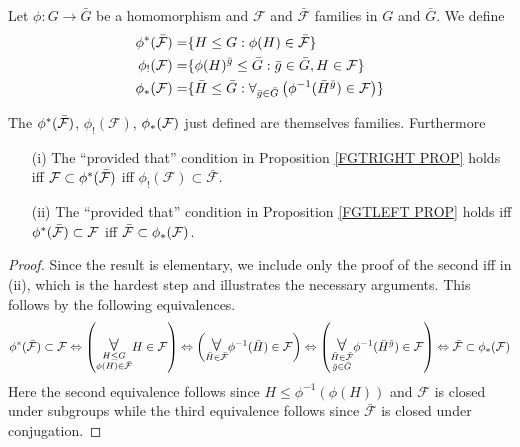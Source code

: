 \documentclass[a4paper,10pt]{article}%
\begin{document}
\begin{definition}
	Let $\phi \colon G \to \bar{G}$ be a homomorphism and $\mathcal{F}$ and $\bar{\mathcal{F}}$ families in $G$
	and $\bar{G}$. We define
\begin{align}\label{PHISTARDEF EQ}
	\phi^{\**}(\bar{\mathcal{F}})
		=&
	\{H \leq G : \phi(H) \in \bar{\mathcal{F}}\}
\\
	\phi_!(\mathcal{F})
		=&
	\{\phi(H)^{\bar{g}}\leq \bar{G} : \bar{g} \in \bar{G}, H \in \mathcal{F}\}
\\ \label{PHISTARDEF3 EQ}
	\phi_{\**}(\mathcal{F})
		=&
	\{\bar{H} \leq \bar{G} : 
	\forall_{\bar{g} \in \bar{G}} 
	\left(
	\phi^{-1}(\bar{H}^{\bar{g}}) \in \mathcal{F}
	\right)\}
\end{align}
\end{definition}

\begin{lemma}\label{REWORFAM LEM}
The $\phi^{\**}(\bar{\mathcal{F}})$, $\phi_{!}(\mathcal{F})$, $\phi_{\**}(\mathcal{F})$ just defined are 
themselves families. Furthermore
\begin{itemize}
\item[(i)] The ``provided that'' condition in Proposition \ref{FGTRIGHT PROP} holds iff 
$\mathcal{F} \subset \phi^{\**} (\bar{\mathcal{F}})$
iff
$\phi_{!}(\mathcal{F}) \subset \bar{\mathcal{F}}$.
\item [(ii)]
The ``provided that'' condition in Proposition \ref{FGTLEFT PROP} holds iff 
$\phi^{\**} (\bar{\mathcal{F}}) \subset \mathcal{F}$
iff
$\bar{\mathcal{F}} \subset \phi_{\**}(\mathcal{F})$.
\end{itemize}
\end{lemma}


\begin{proof}
	Since the result is elementary, we include only the proof of the second iff in (ii), which is the hardest step and illustrates the necessary arguments. This follows by the following equivalences.
\[
	\phi^{\**} (\bar{\mathcal{F}}) \subset \mathcal{F}
\Leftrightarrow
	\left( \underset{ \substack{H \leq G \\ \phi(H) \in \bar{\mathcal{F}} }}{\mathlarger{\mathlarger{\forall}}} 
	H \in \mathcal{F} \right)
\Leftrightarrow
	\left( \underset{\bar{H} \in \bar{\mathcal{F}}}{\mathlarger{\mathlarger{\forall}}}
	\phi^{-1}(\bar{H}) \in \mathcal{F}
	\right)
\Leftrightarrow
	\left( \underset{ \substack{\bar{H} \in \bar{\mathcal{F}}\\\bar{g} \in \bar{G}}}{\mathlarger{\mathlarger{\forall}}}
	\phi^{-1}(\bar{H}^{\bar{g}}) \in \mathcal{F}
	\right)
\Leftrightarrow
        \bar{\mathcal F} \subset \phi_{\**}(\mathcal F)
\]
Here the second equivalence follows since 
$H \leq \phi^{-1}(\phi(H))$ and $\mathcal{F}$ is closed under subgroups while the third equivalence follows since 
$\bar{\mathcal{F}}$ is closed under conjugation. 
\end{proof}
\end{document}
